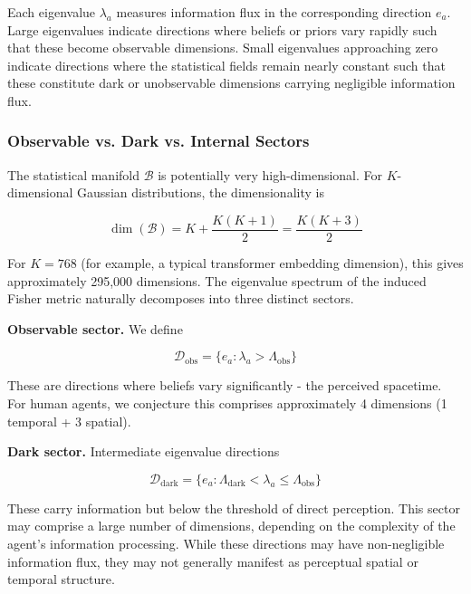 \documentclass[11pt]{article}
\begin{document}
Each eigenvalue $\lambda_a$ measures information flux in the corresponding direction $e_a$. Large eigenvalues indicate directions where beliefs or priors vary rapidly such that these become observable dimensions. Small eigenvalues approaching zero indicate directions where the statistical fields remain nearly constant such that these constitute dark or unobservable dimensions carrying negligible information flux.

\subsubsection{Observable vs. Dark vs. Internal Sectors}

The statistical manifold $\mathcal{B}$ is potentially very high-dimensional. For $K$-dimensional Gaussian distributions, the dimensionality is

\begin{equation}
\dim(\mathcal{B}) = K + \frac{K(K+1)}{2} = \frac{K(K+3)}{2}
\end{equation}

For $K=768$ (for example, a typical transformer embedding dimension), this gives approximately 295,000 dimensions. The eigenvalue spectrum of the induced Fisher metric naturally decomposes into three distinct sectors.

\textbf{Observable sector.} We define

\begin{equation}
\mathcal{D}_{\text{obs}} = \{e_a : \lambda_a > \Lambda_{\text{obs}}\}
\end{equation}

These are directions where beliefs vary significantly - the perceived spacetime. For human agents, we conjecture this comprises approximately 4 dimensions (1 temporal + 3 spatial).

\textbf{Dark sector.} Intermediate eigenvalue directions

\begin{equation}
\mathcal{D}_{\text{dark}} = \{e_a : \Lambda_{\text{dark}} < \lambda_a \leq \Lambda_{\text{obs}}\}
\end{equation}

These carry information but below the threshold of direct perception. This sector may comprise a large number of dimensions, depending on the complexity of the agent's information processing. While these directions may have non-negligible information flux, they may not generally manifest as perceptual spatial or temporal structure.
\end{document}
